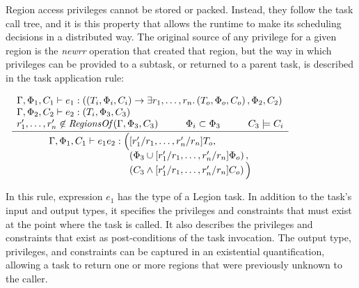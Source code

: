 Region access privileges cannot be stored or packed.  Instead, they follow the
task call tree, and it is this property that allows the runtime to make
its scheduling decisions in a distributed way.  The original source of any
privilege for a given region is the \emph{newrr} operation that created that
region, but the way in which privileges can be provided to a subtask, or
returned to a parent task, is described in the task application rule:

\begin{center}
\begin{math}
\begin{array}{c}
\infrule
{
\begin{array}{lc}
  \Gamma, \Phi_1, C_1 \vdash e_1 : \left(\left(T_i, \Phi_i, C_i\right) \rightarrow \exists r_1, \ldots, r_n . \left(T_o, \Phi_o, C_o\right), \Phi_2, C_2\right) \\
  \Gamma, \Phi_2, C_2 \vdash e_2 : \left(T_i, \Phi_3, C_3\right) \\
  r'_1, \ldots, r'_n \not\in \mathit{RegionsOf}(\Gamma, \Phi_3, C_3) \hspace{1cm} 
  \Phi_i \subset \Phi_3 \hspace{1cm}
  C_3 \models C_i
\end{array}
}
{
\begin{array}{l@{}l}
  \Gamma, \Phi_1, C_1 \vdash e_1 e_2 : \Big( & [r'_1/r_1,\ldots,r'_n/r_n]T_o, \\
 & \left(\Phi_3 \cup [r'_1/r_1,\ldots,r'_n/r_n] \Phi_o\right) , \\
 & \left(C_3 \wedge [r'_1/r_1,\ldots,r'_n/r_n] C_o\right) \Big)
\end{array}
}
\end{array}
\end{math}
\end{center}

In this rule, expression $e_1$ has the type of a Legion task.  In addition
to the task's input and output types, it specifies the privileges and
constraints that must exist at the point where the task is called.  It also
describes the privileges and constraints that exist as post-conditions of the
task invocation.  The output type, privileges, and constraints can be
captured in an existential quantification, allowing a task to return one
or more regions that were previously unknown to the caller.
